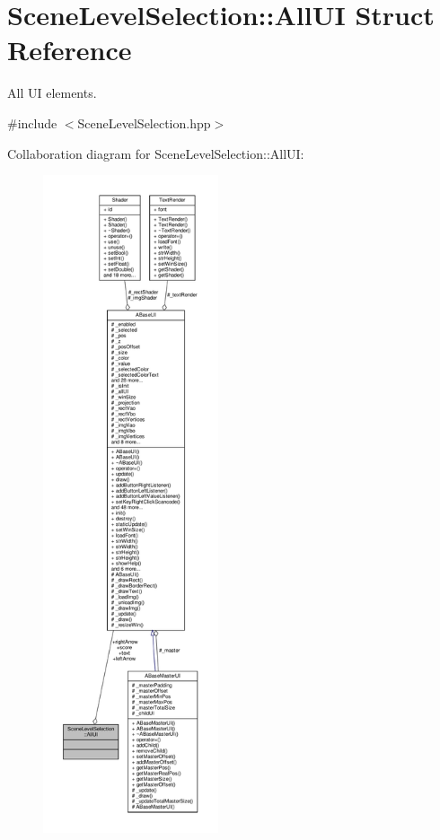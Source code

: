 \hypertarget{struct_scene_level_selection_1_1_all_u_i}{}\section{Scene\+Level\+Selection\+:\+:All\+UI Struct Reference}
\label{struct_scene_level_selection_1_1_all_u_i}


All UI elements.  




{\ttfamily \#include $<$Scene\+Level\+Selection.\+hpp$>$}



Collaboration diagram for Scene\+Level\+Selection\+:\+:All\+UI\+:
\nopagebreak
\begin{figure}[H]
\begin{center}
\leavevmode
\includegraphics[height=550pt]{struct_scene_level_selection_1_1_all_u_i__coll__graph}
\end{center}
\end{figure}
